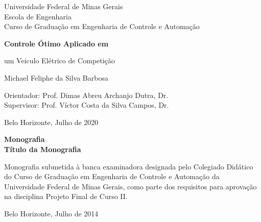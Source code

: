 \begin{titlepage}
\begin{center}
{\large Universidade Federal de Minas Gerais\\
Escola de Engenharia \\
Curso de Graduação em Engenharia de Controle e Automação\\}

\vspace{6cm}
{\bf\Large Controle Ótimo Aplicado em\vspace{0.2cm}

um Veiculo Elétrico de Competição}
\vspace{4cm}

{\large Michael Feliphe da Silva Barbosa}
\vspace{2cm}  
   
\vspace{2cm}          
{\large Orientador: Prof. Dimas Abreu Archanjo Dutra, Dr.}\\
{\large Supervisor: Prof. Víctor Costa da Silva Campos, Dr.}

\vfill
{\large Belo Horizonte, Julho de 2020 }
\end{center}

\end{titlepage}

\newpage
\clearpage
\thispagestyle{empty}


\begin{titlepage}

\centering
\textbf{Monografia}\\
\vspace{2cm}
\centering
\textbf{Título da Monografia}\\
\vspace{5cm} 

\parbox{1.0\textwidth} 
{\large 
Monografia submetida à banca examinadora
designada pelo Colegiado Didático do Curso de
Graduação em Engenharia de Controle e
Automação da Universidade Federal de Minas
Gerais, como parte dos requisitos para aprovação na
disciplina Projeto Final de Curso II.}

\vspace{7cm} 
\centering
Belo Horizonte, Julho de 2014

\end{titlepage}
